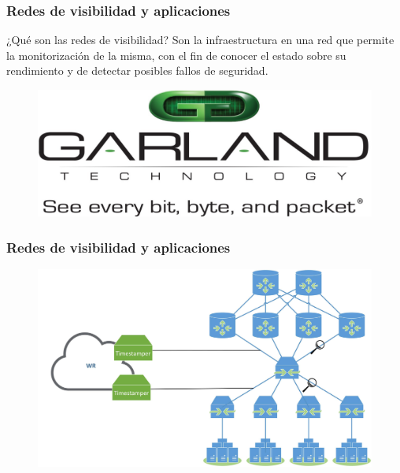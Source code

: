 \documentclass{beamer}
\begin{document}
\begin{frame}
\frametitle{Redes de visibilidad y aplicaciones}
\begin{block}{¿Qué son las redes de visibilidad?}
	Son la infraestructura en una red que permite la monitorización de la misma, con el fin de conocer el estado sobre su rendimiento y de detectar posibles fallos de seguridad.
\end{block}

\begin{figure}[H]
	\centering
	\includegraphics[scale=0.3]{garland3.jpeg}
	\label{garland2}
\end{figure}

\end{frame}


\begin{frame}
\frametitle{Redes de visibilidad y aplicaciones}

\begin{figure}[H]
	\centering
	\includegraphics[scale=0.1]{visibility.jpg}
	\label{visibility}
\end{figure}

\end{frame}

\end{document}

